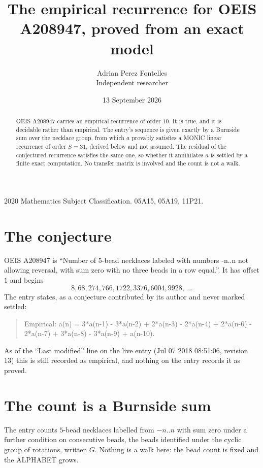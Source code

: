 \documentclass[11pt,a4paper]{article}
\title{The empirical recurrence for OEIS A208947, proved from an exact model}
\author{Adrian Perez Fontelles\\ \small Independent researcher}
\date{13 September 2026}
\theoremstyle{plain}
\theoremstyle{definition}
\begin{document}
\maketitle

\begin{abstract}
OEIS A208947 carries an empirical recurrence of order $10$. It is true, and it is
decidable rather than empirical. The entry's sequence is given exactly by a Burnside sum over the necklace group, from
which $a$ provably satisfies a MONIC linear recurrence of order $S=31$, derived below and not
assumed. The residual of the conjectured recurrence satisfies the same one, so whether it
annihilates $a$ is settled by a finite exact computation. No transfer matrix is involved and
the count is not a walk.
\end{abstract}

\noindent\small 2020 Mathematics Subject Classification. 05A15, 05A19, 11P21.\normalsize

\section{The conjecture}

OEIS A208947 is ``Number of 5-bead necklaces labeled with numbers -n..n not allowing reversal, with sum zero with no three beads in a row equal.''. It has offset $1$ and begins
\[
8, 68, 274, 766, 1722, 3376, 6004, 9928,\ \dots
\]
The entry states, as a conjecture contributed by its author and never marked settled:
\begin{quote}
Empirical: a(n) = 3*a(n-1) - 3*a(n-2) + 2*a(n-3) - 2*a(n-4) + 2*a(n-6) - 2*a(n-7) + 3*a(n-8) - 3*a(n-9) + a(n-10).
\end{quote}
As of the ``Last modified'' line on the live entry (Jul 07 2018 08:51:06, revision 13)
this is still recorded as empirical, and nothing on the entry records it as proved.

\section{The count is a Burnside sum}

The entry counts $5$-bead necklaces labelled from $-n..n$ with sum zero under a further
condition on consecutive beads, the beads identified under the cyclic group of rotations, written $G$. Nothing is a
walk here: the bead count is fixed and the ALPHABET grows.
\end{document}

